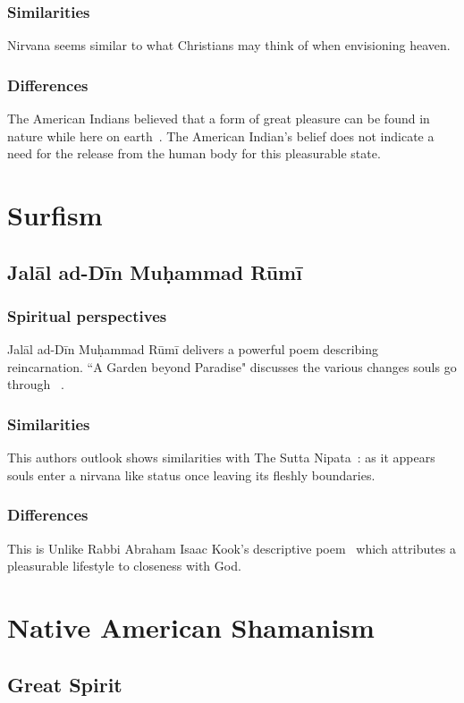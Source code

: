 \documentclass[11pt,a4paper]{scrartcl} %
\begin{document}
     \subsubsection{Similarities}
     Nirvana seems similar to what Christians may think of when envisioning heaven.
     \subsubsection{Differences}
     The American Indians believed that a form of great pleasure can be found in nature while here on earth~\citealp[pg. 186]{eknath}. The American Indian's belief does not indicate a need for the release from the human body for this pleasurable state. 
    \section{Surfism}
    \subsection{Jal\={a}l ad-D\={i}n Muḥammad R\={u}m\={i} }
\subsubsection{Spiritual perspectives}
Jal\={a}l ad-D\={i}n Muḥammad R\={u}m\={i} delivers a powerful poem describing reincarnation. ``A Garden beyond Paradise" discusses the various changes souls go through ~\citealp[pg. 246-247]{eknath}.
     \subsubsection{Similarities}
    This authors outlook shows similarities with The Sutta Nipata~\citealp[pg. 200]{eknath}: as it appears souls enter a nirvana like status once leaving its fleshly boundaries. 
     \subsubsection{Differences}
   This is Unlike Rabbi Abraham Isaac Kook's descriptive poem~\citealp[pg. 39]{eknath} which attributes a pleasurable lifestyle to closeness with God.
     \section{Native American Shamanism}
     \subsection{Great Spirit}
\end{document}
